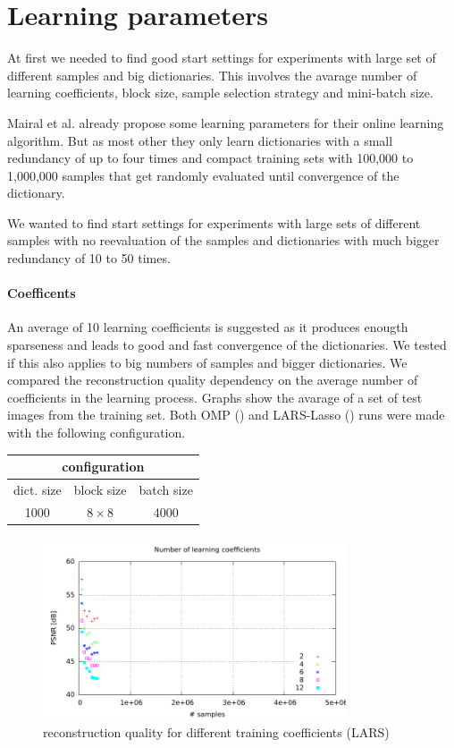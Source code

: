 \section{Learning parameters}
At first we needed to find good start settings for experiments with large set of
different samples and big dictionaries. This involves the
avarage number of learning coefficients, block size, sample selection strategy
and mini-batch size.

Mairal et al. already propose some learning parameters for their online
learning algorithm. But as most other they only learn dictionaries with
a small redundancy of up to four times and compact training sets with 100,000
to 1,000,000 samples that get randomly evaluated until convergence of the
dictionary.

We wanted to find start settings for experiments with large sets of
different samples with no reevaluation of the samples and dictionaries
with much bigger redundancy of 10 to 50 times.


\paragraph{Coefficents}
An average of 10 learning coefficients is suggested as it produces enougth
sparseness and leads to good and fast convergence of the dictionaries.
We tested if this also applies to big numbers of samples and bigger
dictionaries. We compared the reconstruction quality dependency on the average
number of coefficients in the learning process. Graphs show the avarage of a
set of test images from the training set. Both OMP ()
and LARS-Lasso () runs were made with the following
configuration.
\begin{table}[H]
\centering
\begin{tabular}{| c | c | c |}
\hline
\multicolumn{3}{|c|}{configuration}\\
\hline
dict. size & block size & batch size \\
\hline
1000 & $8\times 8$ & 4000  \\
\hline
\end{tabular}
\end{table}

\begin{figure}[h]
\centering
\includegraphics[width = 0.8\textwidth]{../tests/results/coeffsConverg.pdf}
\caption{reconstruction quality for different training coefficients (LARS)}
\label{fig:coeffsLasso}
\end{figure}

